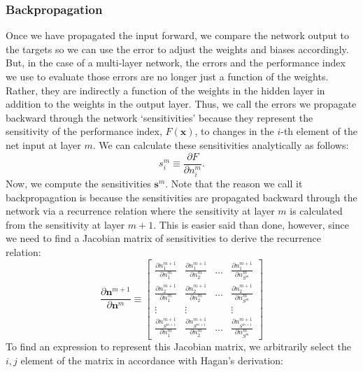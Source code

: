 \documentclass[12pt,halfline,a4paper]{ouparticle}
\begin{document}
\subsubsection{Backpropagation}
\label{sec4.2.3}
Once we have propagated the input forward, we compare the network output to the targets so we can use the error to adjust the weights and biases accordingly. But, in the case of a multi-layer network, the errors and the performance index we use to evaluate those errors are no longer just a function of the weights. Rather, they are indirectly a function of the weights in the hidden layer in addition to the weights in the output layer. Thus, we call the errors we propagate backward through the network `sensitivities' because they represent the sensitivity of the performance index, $F(\mathbf{x})$, to changes in the $i$-th element of the net input at layer $m$. We can calculate these sensitivities analytically as follows: 
\begin{equation}
s^{m}_{i} \equiv \frac{\partial F}{\partial n^{m}_{i}}. 
\end{equation}
Now, we compute the sensitivities $\mathbf{s}^{m}$. Note that the reason we call it backpropagation is because the sensitivities are propagated backward through the network via a recurrence relation where the sensitivity at layer $m$ is calculated from the sensitivity at layer $m+1$. This is easier said than done, however, since we need to find a Jacobian matrix of sensitivities to derive the recurrence relation: 
\begin{equation}
\frac{\partial \mathbf{n}^{m+1}}{\partial \mathbf{n}^{m}} \equiv \begin{bmatrix} 
\frac{\partial n^{m+1}_{1}}{\partial n^{m}_{1}} &  \frac{\partial n^{m+1}_{1}}{\partial n^{m}_{2}} & \dots &  \frac{\partial n^{m+1}_{1}}{\partial n^{m}_{S^{m}}} \\
\frac{\partial n^{m+1}_{2}}{\partial n^{m}_{1}} &  \frac{\partial n^{m+1}_{2}}{\partial n^{m}_{2}} & \dots & \frac{\partial n^{m+1}_{2}}{\partial n^{m}_{S^{m}}} \\
\vdots & \vdots &  & \vdots \\
\frac{\partial n^{m+1}_{S^{m+1}}}{\partial n^{m}_{1}} &  \frac{\partial n^{m+1}_{S^{m+1}}}{\partial n^{m}_{2}} & \dots & \frac{\partial n^{m+1}_{S^{m+1}}}{\partial n^{m}_{S^{m}}}
\end{bmatrix}
\end{equation}
To find an expression to represent this Jacobian matrix, we arbitrarily select the $i, j$ element of the matrix in accordance with Hagan's derivation: 
\end{document}
